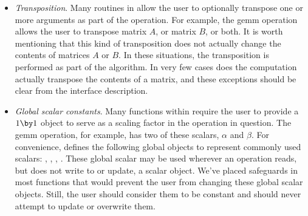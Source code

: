 \begin{itemize}
\item
{\em Transposition}.
Many routines in \libflame allow the user to optionally transpose one or
more arguments as part of the operation.
For example, the {\sc gemm} operation allows the user to transpose
matrix $ A $, or matrix $ B $, or both.
It is worth mentioning that this kind of transposition does not actually
change the contents of matrices $ A $ or $ B $.
In these situations, the transposition is performed as part of the algorithm.
In very few cases does the computation actually transpose the contents of
a matrix, and these exceptions should be clear from the interface description.

\item
{\em Global scalar constants}.
Many functions within \libflame require the user to provide a $ 1 \by 1 $
object to serve as a scaling factor in the operation in question.
The {\sc gemm} operation, for example, has two of these scalars, $ \alpha $
and $ \beta $.
For convenience, \libflame defines the following global objects to represent
commonly used scalars: \flaminusonens, \flazerons, \flaonens, \flatwons.
These global scalar may be used wherever an operation reads, but does not
write to or update, a scalar object.
We've placed safeguards in most \libflame functions that would prevent the
user from changing these global scalar objects.
Still, the user should consider them to be constant and should never attempt
to update or overwrite them.

\end{itemize}








